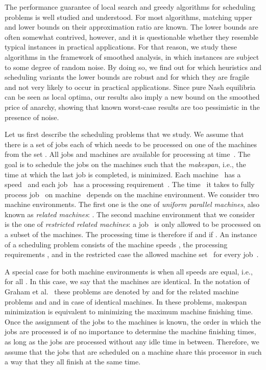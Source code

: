\documentclass[a4paper,11pt,fleqn]{article}
\begin{document}
The performance guarantee of local search and greedy algorithms for scheduling
problems is well studied and understood. For most algorithms, matching upper and
lower bounds on their approximation ratio are known. The lower bounds are often
somewhat contrived, however, and it is questionable whether they resemble typical
instances in practical applications. For that reason, we study these algorithms
in the framework of smoothed analysis, in which instances are subject to some
degree of random noise. By doing so, we find out for which heuristics and
scheduling variants the lower bounds are robust and for which they are fragile and
not very likely to occur in practical applications. Since pure Nash equilibria
can be seen as local optima, our results also imply a
new bound on the smoothed price of anarchy, showing that known worst-case
results are too pessimistic in the presence of noise.

Let us first describe the scheduling problems that we study. We assume that
there is a set  of jobs each of which needs to
be processed on one of the machines from the set .
All jobs and machines are available for processing at time~. The goal is to
schedule the jobs on the machines such that the \emph{makespan}, i.e., the time
at which the last job is completed, is minimized. Each machine~ has a
speed~ and each job~ has a processing
requirement~. 
The time~ it takes to fully process job~ on machine~ depends on
the machine environment. We consider two machine environments. The first one is
the one of \emph{uniform parallel machines}, also known as
\emph{related machines}:
. The second machine environment that we consider is the
one of \emph{restricted related machines}: a job~ is only allowed to be
processed on a subset  of the machines. The processing
time is therefore  if  and  if . An instance~ of a scheduling problem
consists of the machine speeds , the processing requirements
, and in the restricted case the allowed machine
set~ for every job~.

A special case for both machine environments is when all speeds are
equal, i.e.,  for all . In this case, we say that the
machines are identical. In the notation of Graham et
al.~\cite{graham:etal:79} these problems are denoted by  and
 for the related machine problems and  and
 in case of identical machines.
In these problems, makespan minimization is equivalent to
minimizing the maximum machine finishing time. Once the assignment of
the jobs to the machines is known, the order in which the jobs are
processed is of no importance to determine the machine finishing times,
as long as the jobs are processed without any idle time in between.
Therefore, we assume that the
jobs that are scheduled on a machine  share this processor in
such a way that they all finish at the same time.
\end{document}
